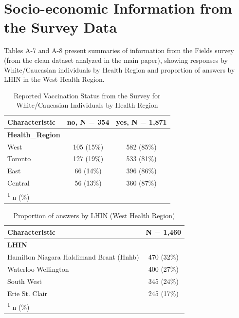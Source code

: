 \documentclass[
  letterpaper,
  DIV=11,
  numbers=noendperiod]{scrartcl}
\begin{document}
\hypertarget{socio-economic-information-from-the-survey-data}{%
\section{Socio-economic Information from the Survey
Data}\label{socio-economic-information-from-the-survey-data}}

Tables A-7 and A-8 present summaries of information from the Fields
survey (from the clean dataset analyzed in the main paper), showing
responses by White/Caucasian individuals by Health Region and proportion
of answers by LHIN in the West Health Region.

\hypertarget{tbl-hr-percentages}{}
\begin{table}
\caption{\label{tbl-hr-percentages}Reported Vaccination Status from the Survey for White/Caucasian
Individuals by Health Region }\tabularnewline

\centering
\begin{tabular}{lcc}
\toprule
\textbf{Characteristic} & \textbf{no}, N = 354 & \textbf{yes}, N = 1,871\\
\midrule
\textbf{Health\_Region} &  & \\
\hspace{1em}West & 105 (15\%) & 582 (85\%)\\
\hspace{1em}Toronto & 127 (19\%) & 533 (81\%)\\
\hspace{1em}East & 66 (14\%) & 396 (86\%)\\
\hspace{1em}Central & 56 (13\%) & 360 (87\%)\\
\bottomrule
\multicolumn{3}{l}{\rule{0pt}{1em}\textsuperscript{1} n (\%)}\\
\end{tabular}
\end{table}

\hypertarget{tbl-west-hr-lhin}{}
\begin{table}
\caption{\label{tbl-west-hr-lhin}Proportion of answers by LHIN (West Health Region) }\tabularnewline

\centering
\begin{tabular}{lc}
\toprule
\textbf{Characteristic} & \textbf{N = 1,460}\\
\midrule
\textbf{LHIN} & \\
\hspace{1em}Hamilton Niagara Haldimand Brant (Hnhb) & 470 (32\%)\\
\hspace{1em}Waterloo Wellington & 400 (27\%)\\
\hspace{1em}South West & 345 (24\%)\\
\hspace{1em}Erie St. Clair & 245 (17\%)\\
\bottomrule
\multicolumn{2}{l}{\rule{0pt}{1em}\textsuperscript{1} n (\%)}\\
\end{tabular}
\end{table}
\end{document}
